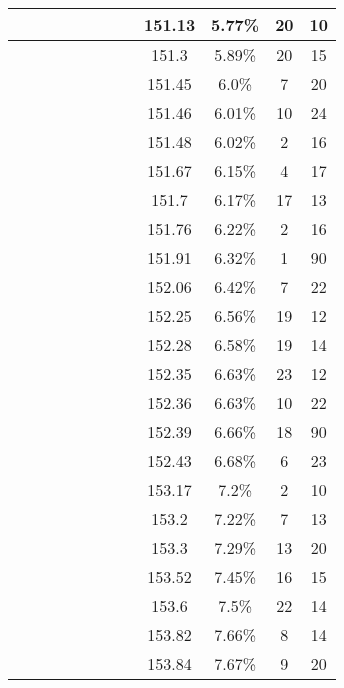 \begin{center}
\begin{longtable}{|c|c|c|c|c|c|c|c|c|c|c|c|}
 \x &  &  \x &  \x &  &  &  &  & 151.13 & 5.77\% & 20 & 10 \\ \hline
 \x &  &  &  \x &  &  &  &  \x & 151.3 & 5.89\% & 20 & 15 \\ \hline
 \x &  \x &  &  \x &  &  \x &  &  \x & 151.45 & 6.0\% & 7 & 20 \\ \hline
 \x &  \x &  \x &  \x &  \x &  \x &  &  & 151.46 & 6.01\% & 10 & 24 \\ \hline
 \x &  \x &  &  &  \x &  \x &  \x &  \x & 151.48 & 6.02\% & 2 & 16 \\ \hline
 \x &  \x &  &  \x &  \x &  \x &  \x &  \x & 151.67 & 6.15\% & 4 & 17 \\ \hline
 \x &  &  \x &  \x &  &  &  &  \x & 151.7 & 6.17\% & 17 & 13 \\ \hline
 \x &  &  \x &  \x &  \x &  \x &  \x &  \x & 151.76 & 6.22\% & 2 & 16 \\ \hline
 \x &  &  \x &  \x &  \x &  \x &  &  \x & 151.91 & 6.32\% & 1 & 90 \\ \hline
 \x &  &  \x &  \x &  &  \x &  \x &  \x & 152.06 & 6.42\% & 7 & 22 \\ \hline
 \x &  \x &  &  &  \x &  &  &  & 152.25 & 6.56\% & 19 & 12 \\ \hline
 \x &  &  &  &  \x &  \x &  &  \x & 152.28 & 6.58\% & 19 & 14 \\ \hline
 \x &  \x &  &  \x &  &  &  &  \x & 152.35 & 6.63\% & 23 & 12 \\ \hline
 \x &  \x &  &  &  &  \x &  \x &  & 152.36 & 6.63\% & 10 & 22 \\ \hline
 \x &  \x &  \x &  \x &  \x &  &  \x &  \x & 152.39 & 6.66\% & 18 & 90 \\ \hline
 \x &  &  &  \x &  \x &  \x &  &  \x & 152.43 & 6.68\% & 6 & 23 \\ \hline
 \x &  \x &  &  &  \x &  \x &  &  & 153.17 & 7.2\% & 2 & 10 \\ \hline
 \x &  \x &  \x &  &  &  &  \x &  & 153.2 & 7.22\% & 7 & 13 \\ \hline
 \x &  &  \x &  \x &  \x &  &  \x &  \x & 153.3 & 7.29\% & 13 & 20 \\ \hline
 \x &  &  \x &  \x &  &  &  \x &  & 153.52 & 7.45\% & 16 & 15 \\ \hline
 \x &  &  &  \x &  &  &  &  & 153.6 & 7.5\% & 22 & 14 \\ \hline
 \x &  \x &  \x &  &  &  \x &  \x &  & 153.82 & 7.66\% & 8 & 14 \\ \hline
 \x &  &  \x &  \x &  \x &  &  &  & 153.84 & 7.67\% & 9 & 20 \\ \hline

\end{longtable}
\end{center}

